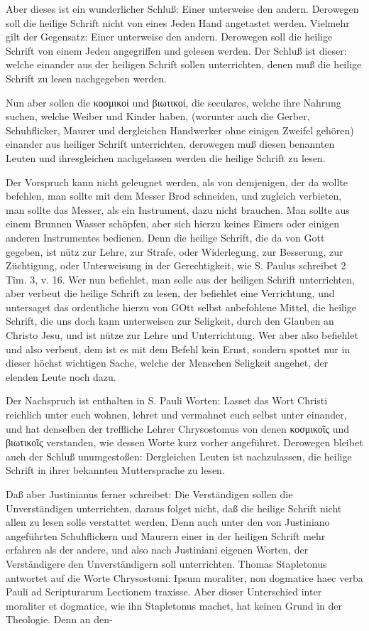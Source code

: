 Aber dieses ist ein wunderlicher Schluß: Einer unterweise den andern. Derowegen soll die heilige Schrift nicht von eines Jeden Hand angetastet werden. Vielmehr gilt der Gegensatz: Einer unterweise den andern. Derowegen soll die heilige Schrift von einem Jeden angegriffen und gelesen werden. Der Schluß ist dieser: welche einander aus der heiligen Schrift sollen unterrichten, denen muß die heilige Schrift zu lesen nachgegeben werden.

Nun aber sollen die κοσμικοί und βιωτικοί, die seculares, welche ihre Nahrung suchen, welche Weiber und Kinder haben, (worunter auch die Gerber, Schuhflicker, Maurer und dergleichen Handwerker ohne einigen Zweifel gehören) einander aus heiliger Schrift unterrichten, derowegen muß diesen benannten Leuten und ihresgleichen nachgelassen werden die heilige Schrift zu lesen.

Der Vorspruch kann nicht geleugnet werden, als von demjenigen, der da wollte befehlen, man sollte mit dem Messer Brod schneiden, und zugleich verbieten, man sollte das Messer, als ein Instrument, dazu nicht brauchen. Man sollte aus einem Brunnen Wasser schöpfen, aber sich hierzu keines Eimers oder einigen anderen Instrumentes bedienen. Denn die heilige Schrift, die da von Gott gegeben, ist nütz zur Lehre, zur Strafe, oder Widerlegung, zur Besserung, zur Züchtigung, oder Unterweisung in der Gerechtigkeit, wie S. Paulus schreibet 2 Tim. 3, v. 16. Wer nun befiehlet, man solle aus der heiligen Schrift unterrichten, aber verbeut die heilige Schrift zu lesen, der befiehlet eine Verrichtung, und untersaget das ordentliche hierzu von GOtt selbst anbefohlene Mittel, die heilige Schrift, die uns doch kann unterweisen zur Seligkeit, durch den Glauben an Christo Jesu, und ist nütze zur Lehre und Unterrichtung. Wer aber also befiehlet und also verbeut, dem ist es mit dem Befehl kein Ernst, sondern spottet nur in dieser höchst wichtigen Sache, welche der Menschen Seligkeit angehet, der elenden Leute noch dazu.

Der Nachspruch ist enthalten in S. Pauli Worten: Lasset das Wort Christi reichlich unter euch wohnen, lehret und vermahnet euch selbst unter einander, und hat denselben der treffliche Lehrer Chrysostomus von denen κοσμικοῖς und βιωτικοῖς verstanden, wie dessen Worte kurz vorher angeführet. Derowegen bleibet auch der Schluß unumgestoßen: Dergleichen Leuten ist nachzulassen, die heilige Schrift in ihrer bekannten Muttersprache zu lesen.

Daß aber Justinianus ferner schreibet: Die Verständigen sollen die Unverständigen unterrichten, daraus folget nicht, daß die heilige Schrift nicht allen zu lesen solle verstattet werden. Denn auch unter den von Justiniano angeführten Schuhflickern und Maurern einer in der heiligen Schrift mehr erfahren als der andere, und also nach Justiniani eigenen Worten, der Verständigere den Unverständigern soll unterrichten. Thomas Stapletonus antwortet auf die Worte Chrysostomi: Ipsum moraliter, non dogmatice haec verba Pauli ad Scripturarum Lectionem traxisse. Aber dieser Unterschied inter moraliter et dogmatice, wie ihn Stapletonus machet, hat keinen Grund in der Theologie. Denn an den-

